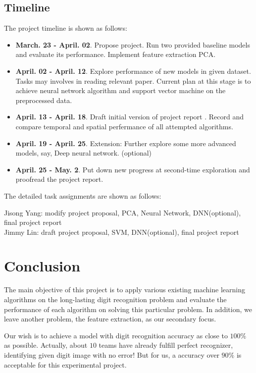 \documentclass{article} %
\begin{document}
\subsection{Timeline}
The project timeline is shown as follows:
\begin{itemize}
    \item{\textbf{March. 23 - April. 02}. Propose project. Run two 
            provided baseline models and evaluate its performance. 
            Implement feature extraction PCA.}
    \item{\textbf{April. 02 - April. 12}. Explore performance of new models in
        given dataset. Tasks may involves in reading relevant paper. Current
        plan at this stage is to achieve neural network algorithm and
        support vector machine on the preprocessed data.}
    \item{\textbf{April. 13 - April. 18}. Draft initial version of project report
        . Record and compare temporal and spatial perfermance of all attempted algorithms. }
    \item{\textbf{April. 19 - April. 25}. Extension: Further explore some more advanced
            models, say, Deep neural network. (optional)}
    \item{\textbf{April. 25 - May. 2}. Put down new progress at second-time
            exploration and proofread the project report.}
\end{itemize}

The detailed task assignments are shown as follows:

    Jisong Yang: modify project proposal, PCA, Neural Network, DNN(optional),
    final project report \\
    Jimmy Lin: draft project proposal, SVM, DNN(optional), final project report

\section{Conclusion} \label{Conclusion}
    The main objective of this project is to apply various existing machine
    learning algorithms on the long-lasting digit recognition problem and
    evaluate the performance of each algorithm on solving this particular
    problem.
    In addition, we leave another problem, the feature extraction, as our
    secondary focus. 
    
    Our wish is to achieve a model with digit recognition accuracy as close to
    $100\%$ as possible. Actually, about $10$ teams have already fulfill
    perfect recognizer, identifying given digit image with no error!  But for
    us, a accuracy over $90\%$ is acceptable for this experimental project.
\end{document}
